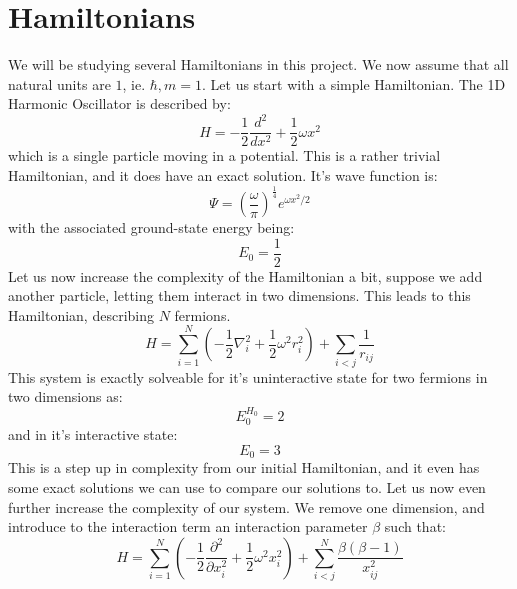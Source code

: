 \documentclass[12pt]{article}
\begin{document}
{\section{Hamiltonians}
We will be studying several Hamiltonians in this project. We now assume that all natural units are $1$, ie. $\hbar, m= 1$. \newline Let us start with a simple Hamiltonian.
\newline The 1D Harmonic Oscillator is described by:
\begin{equation}
    H = -\frac{1}{2} \frac{d^2}{dx^2} + \frac{1}{2}\omega x^2
\end{equation}
which is a single particle moving in a potential. This is a rather trivial Hamiltonian, and it does have an exact solution. It's wave function is:
\begin{equation*}
    \Psi = \left( \frac{\omega}{\pi} \right)^\frac{1}{4} e^{\omega x^2/2}
\end{equation*}
with the associated ground-state energy being:
\begin{equation*}
    E_0 = \frac{1}{2}
\end{equation*}
Let us now increase the complexity of the Hamiltonian a bit, suppose we add another particle, letting them interact in two dimensions. This leads to this Hamiltonian, describing $N$ fermions. 
\begin{equation}
    H = \sum_{i=1}^N \left( -\frac{1}{2}\nabla_i^2 + \frac{1}{2} \omega^2 r_i^2 \right) + \sum_{i<j} \frac{1}{r_{ij}}
\end{equation}
This system is exactly solveable for it's uninteractive state for two fermions in two dimensions as:
\begin{equation*}
    E_0^{H_0} = 2
\end{equation*}
and in it's interactive state:
\begin{equation*}
    E_0 = 3
\end{equation*}
This is a step up in complexity from our initial Hamiltonian, and it even has some exact solutions we can use to compare our solutions to. \newline
Let us now even further increase the complexity of our system. \newline
We remove one dimension, and introduce to the interaction term an interaction parameter $\beta$ such that:
\begin{equation}
    H = \sum_{i=1}^N \left( - \frac{1}{2} \frac{\partial^2}{\partial x^2_i} + \frac{1}{2}\omega^2 x^2_i \right) +\sum_{i<j}^N \frac{\beta(\beta - 1)}{x_{ij}^2}

\end{equation}}
\end{document}

